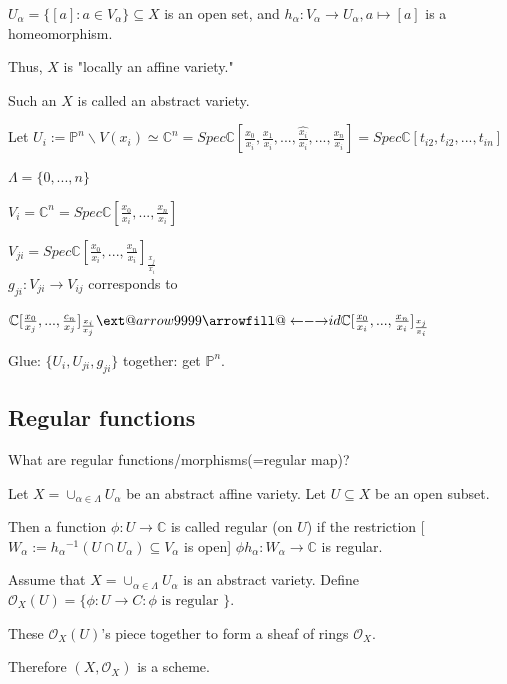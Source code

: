 \documentclass[a4paper,12pt]{amsart}
\makeatletter
\newcommand{\C}{\ensuremath{\mathbb{C}}}
\newcommand{\iv}{\ensuremath{^{-1}}}
\newcommand\xleftrightarrow[2][]{%
	\ext@arrow 9999{\longleftrightarrowfill@}{#1}{#2}}
\newcommand\longleftrightarrowfill@{%
	\arrowfill@\leftarrow\relbar\rightarrow}
\makeatother
\begin{document}
\begin{Eg}
	$U_\alpha=\{[a]: a\in V_\alpha\}\subseteq X$ is an open set, 
	and $h_\alpha: V_\alpha\to U_\alpha, a\mapsto[a]$ is a homeomorphism.
	
	Thus, $X$ is "locally an affine variety."
\end{Eg}
Such an $X$ is called an abstract variety.
\\
\begin{Eg}
	Let $U_i:=\mathbb{P}^n\backslash V(x_i)\simeq \C^n=Spec\C[\frac{x_0}{x_i},\frac{x_1}{x_i},...,\hat{\frac{x_i}{x_i}},...,\frac{x_n}{x_i}]=Spec\C[t_{i2},t_{i2},...,t_{in}]$
	
	$\Lambda=\{0,...,n\}$
	
	$V_i=\C^n=Spec\C[\frac{x_0}{x_i},...,\frac{x_n}{x_i}]$
	
	$V_{ji}=Spec\C[\frac{x_0}{x_i},...,\frac{x_n}{x_i}]_{\frac{x_j}{x_i}}$
	\\
	
	$g_{ji}:V_{ji}\to V_{ij}$ corresponds to
	
	$\C[\frac{x_0}{x_j},...,\frac{c_n}{x_j}]_{\frac{x_i}{x_j}}\xleftrightarrow{id}\C[\frac{x_0}{x_i},...,\frac{x_n}{x_i}]_{\frac{x_j}{x_i}}$
	
	Glue: $\{U_i,U_{ji},g_{ji}\}$ together: get $\mathbb{P}^n$.
\end{Eg}

\subsection{Regular functions}
What are regular functions/morphisms(=regular map)?

Let $X=\cup_{\alpha \in \Lambda} U_\alpha$ be an abstract affine variety. Let $U\subseteq X$ be an open subset. 

Then a function $\phi:U\to \C$ is called regular (on $U$) if the restriction [$W_\alpha:=h_\alpha\iv(U\cap U_\alpha)\subseteq V_\alpha$ is open] $\phi h_\alpha: W_\alpha \to \C$ is regular.
\\
\begin{Def}Assume that $X=\cup_{\alpha \in \Lambda}U_\alpha$ is an abstract variety.
	Define $ \mathcal{O}_X(U)=\{\phi:U\to C: \phi \text{ is regular } \}$.
\end{Def}
\begin{Proposition}
	These $\mathcal{O}_X(U)$'s piece together to form a sheaf of rings $\mathcal{O}_X$.
\end{Proposition} 
Therefore $(X,\mathcal{O}_X)$ is a scheme.
\\
\end{document}

